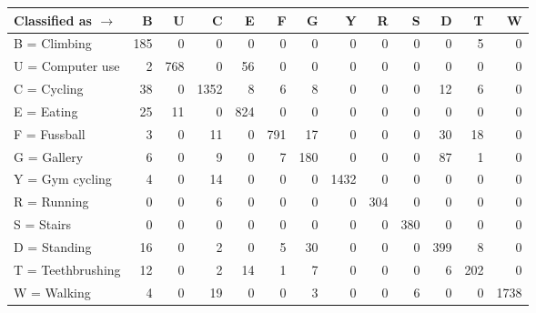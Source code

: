 \begin{tabular}{lrrrrrrrrrrrr}
\toprule
Classified as $\rightarrow$ &    B &    U &     C &    E &    F &    G &     Y &    R &    S &    D &    T &     W \\
\midrule
B = Climbing      &  185 &    0 &     0 &    0 &    0 &    0 &     0 &    0 &    0 &    0 &    5 &     0 \\
U = Computer use  &    2 &  768 &     0 &   56 &    0 &    0 &     0 &    0 &    0 &    0 &    0 &     0 \\
C = Cycling       &   38 &    0 &  1352 &    8 &    6 &    8 &     0 &    0 &    0 &   12 &    6 &     0 \\
E = Eating        &   25 &   11 &     0 &  824 &    0 &    0 &     0 &    0 &    0 &    0 &    0 &     0 \\
F = Fussball      &    3 &    0 &    11 &    0 &  791 &   17 &     0 &    0 &    0 &   30 &   18 &     0 \\
G = Gallery       &    6 &    0 &     9 &    0 &    7 &  180 &     0 &    0 &    0 &   87 &    1 &     0 \\
Y = Gym cycling   &    4 &    0 &    14 &    0 &    0 &    0 &  1432 &    0 &    0 &    0 &    0 &     0 \\
R = Running       &    0 &    0 &     6 &    0 &    0 &    0 &     0 &  304 &    0 &    0 &    0 &     0 \\
S = Stairs        &    0 &    0 &     0 &    0 &    0 &    0 &     0 &    0 &  380 &    0 &    0 &     0 \\
D = Standing      &   16 &    0 &     2 &    0 &    5 &   30 &     0 &    0 &    0 &  399 &    8 &     0 \\
T = Teethbrushing &   12 &    0 &     2 &   14 &    1 &    7 &     0 &    0 &    0 &    6 &  202 &     0 \\
W = Walking       &    4 &    0 &    19 &    0 &    0 &    3 &     0 &    0 &    6 &    0 &    0 &  1738 \\
\bottomrule
\end{tabular}
